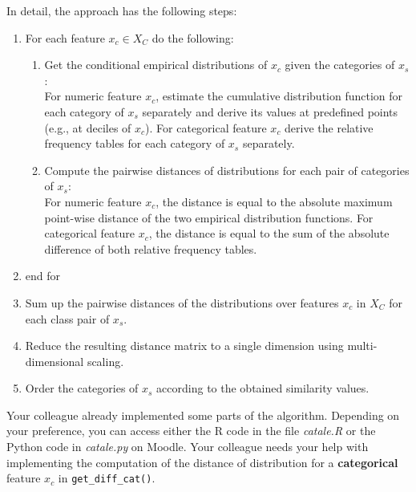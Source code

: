 {\begin{enumerate}[a)]
In detail, the approach has the following steps: 
\begin{enumerate}[1)]
  \item For each feature $x_c \in X_C$ do the following: 
  \begin{enumerate}
    \item Get the conditional empirical distributions of $x_c$ given the categories of $x_s$: \\
     For numeric feature $x_c$, estimate the cumulative distribution function for each category of $x_s$ separately and derive its values at predefined points (e.g., at deciles of $x_c$). 
     For categorical feature $x_c$ derive the relative frequency tables for each category of $x_s$ separately.
    \item Compute the pairwise distances of distributions for each pair of categories of $x_s$:\\ 
    For numeric feature $x_c$, the distance is equal to the absolute maximum point-wise distance of the two empirical distribution functions. For categorical feature $x_c$, the distance is equal to the sum of the absolute difference of both relative frequency tables.   
  \end{enumerate}
  \item end for
  \item Sum up the pairwise distances of the distributions over features $x_c$ in $X_C$ for each class pair of $x_s$. 
  \item Reduce the resulting distance matrix to a single dimension using multi-dimensional scaling.
  \item Order the categories of $x_s$ according to the obtained similarity values.
\end{enumerate}

Your colleague already implemented some parts of the algorithm.
Depending on your preference, you can access either the R code in the file \textit{catale.R} or the Python code in \textit{catale.py} on Moodle.
Your colleague needs your help with implementing the computation of the distance of distribution for a \textbf{categorical} feature $x_c$ in \texttt{get\_diff\_cat()}. 


\end{enumerate}}
